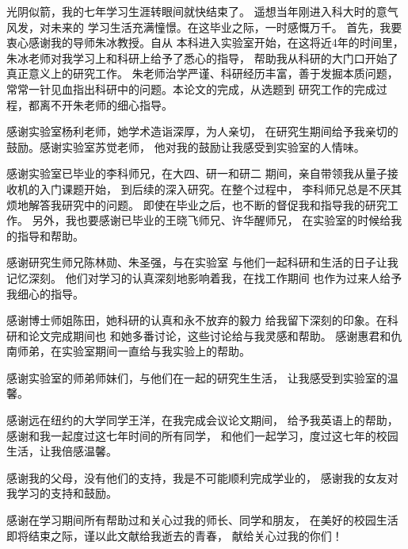 \begin{acknowledgements}
光阴似箭，我的七年学习生涯转眼间就快结束了。
遥想当年刚进入科大时的意气风发，对未来的
学习生活充满憧憬。在这毕业之际，一时感慨万千。
首先，我要衷心感谢我的导师朱冰教授。自从
本科进入实验室开始，在这将近4年的时间里，
朱冰老师对我学习上和科研上给予了悉心的指导，
帮助我从科研的大门口开始了真正意义上的研究工作。
朱老师治学严谨、科研经历丰富，善于发掘本质问题，
常常一针见血指出科研中的问题。本论文的完成，从选题到
研究工作的完成过程，都离不开朱老师的细心指导。

感谢实验室杨利老师，她学术造诣深厚，为人亲切，
在研究生期间给予我亲切的鼓励。感谢实验室苏觉老师，
他对我的鼓励让我感受到实验室的人情味。

感谢实验室已毕业的李科师兄，在大四、研一和研二
期间，亲自带领我从量子接收机的入门课题开始，
到后续的深入研究。在整个过程中，
李科师兄总是不厌其烦地解答我研究中的问题。
即使在毕业之后，也不断的督促我和指导我的研究工作。
另外，我也要感谢已毕业的王晓飞师兄、许华醒师兄，
在实验室的时候给我的指导和帮助。

感谢研究生师兄陈林勋、朱圣强，与在实验室
与他们一起科研和生活的日子让我记忆深刻。
他们对学习的认真深刻地影响着我，在找工作期间
也作为过来人给予我细心的指导。

感谢博士师姐陈田，她科研的认真和永不放弃的毅力
给我留下深刻的印象。在科研和论文完成期间也
和她多番讨论，这些讨论给与我灵感和帮助。
感谢惠君和仇南师弟，在实验室期间一直给与我实验上的帮助。

感谢实验室的师弟师妹们，与他们在一起的研究生生活，
让我感受到实验室的温馨。

感谢远在纽约的大学同学王洋，在我完成会议论文期间，
给予我英语上的帮助，感谢和我一起度过这七年时间的所有同学，
和他们一起学习，度过这七年的校园生活，让我倍感温馨。

感谢我的父母，没有他们的支持，我是不可能顺利完成学业的，
感谢我的女友对我学习的支持和鼓励。

感谢在学习期间所有帮助过和关心过我的师长、同学和朋友，
在美好的校园生活即将结束之际，谨以此文献给我逝去的青春，
献给关心过我的你们！

\end{acknowledgements}
